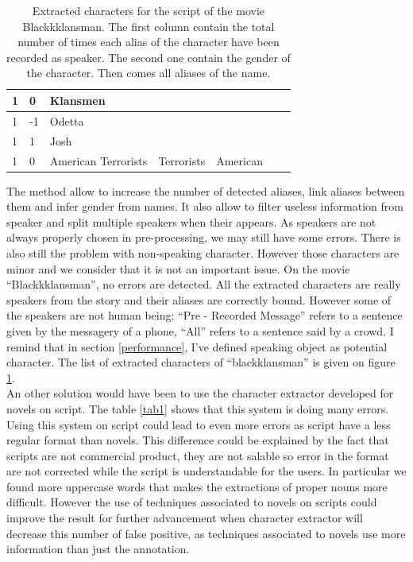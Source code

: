 \documentclass[a4paper, 12pt]{report}
\begin{document}
\begin{table}[]
{\begin{tabular}{|l|l|l|l|l|l|l|}
1                & 0        & Klansmen                   &                  &           &          &            \\ \hline
1                & -1       & Odetta                     &                  &           &          &            \\ \hline
1                & 1        & Josh                       &                  &           &          &            \\ \hline
1                & 0        & American Terrorists        & Terrorists       & American  &          &            \\ \hline
\end{tabular}}
\caption{Extracted characters for the script of the movie Blackkklansman. The first column contain the total number of times each alias of the character have been recorded as speaker. The second one contain the gender of the character. Then comes all aliases of the name. }
\label{character_bkm}
\end{table}


The method allow to increase the number of detected aliases, link aliases between them and infer gender from names. It also allow to filter useless information from speaker and split multiple speakers when their appears. As speakers are not always properly chosen in pre-processing, we may still have some errors. There is also still the problem with non-speaking character. However those characters are minor and we consider that it is not an important issue.  On the movie ``Blackkklansman'', no errors are detected. All the extracted characters are really speakers from the story and their aliases are correctly bound. However some of the speakers are not human being: ``Pre - Recorded Message'' refers to a sentence given by the messagery of a phone, ``All'' refers to a sentence said by a crowd. I remind that in section \ref{performance}, I've defined speaking object as potential character. The list of extracted characters of ``blackklansman'' is given on figure \ref{character_bkm}.\\

An other solution would have been to use the character extractor developed for novels on script. The table \ref{tab1} shows that this system is  doing many errors. Using this system on script could lead to even more errors as script have a less regular format than novels. This difference could be explained by the fact that scripts are not commercial product, they are not salable so error in the format are not corrected while the script is understandable for the users. In particular we found more uppercase words that makes the extractions of proper nouns more difficult. However the use of techniques associated to novels on scripts could improve the result for further advancement when character extractor will decrease this number of false positive, as techniques associated to novels use more information than just the annotation.\\
\end{document}
